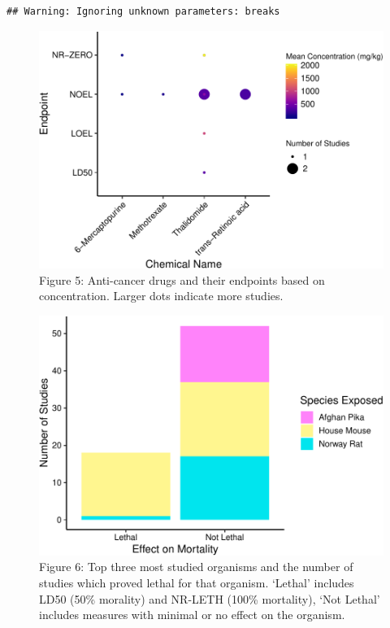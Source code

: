 \documentclass[12pt,]{article}
\begin{document}
\begin{verbatim}
## Warning: Ignoring unknown parameters: breaks
\end{verbatim}

\begin{figure}
\centering
\includegraphics{Reents_ENV872L_Project_files/figure-latex/visualization 2-1.pdf}
\caption{Figure 5: Anti-cancer drugs and their endpoints based on
concentration. Larger dots indicate more studies.}
\end{figure}

\begin{figure}
\centering
\includegraphics{Reents_ENV872L_Project_files/figure-latex/Visualization3-1.pdf}
\caption{Figure 6: Top three most studied organisms and the number of
studies which proved lethal for that organism. `Lethal' includes LD50
(50\% morality) and NR-LETH (100\% mortality), `Not Lethal' includes
measures with minimal or no effect on the organism.}
\end{figure}
\end{document}
